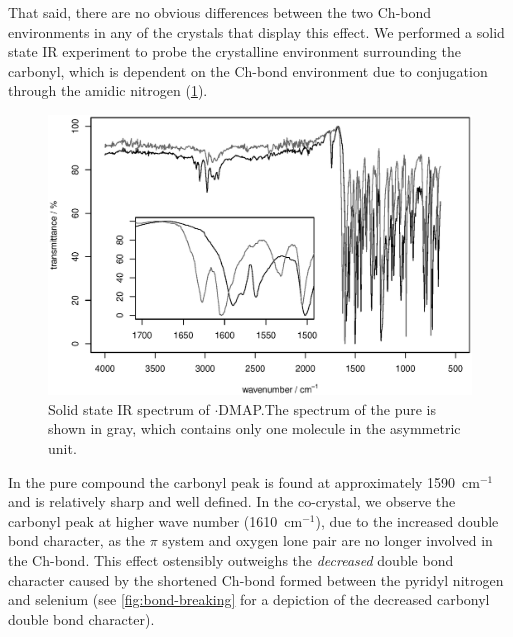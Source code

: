 \begin{refsection}
That said, there are no obvious differences between the two Ch-bond environments in any of the crystals that display this effect.
We performed a solid state IR experiment to probe the crystalline environment surrounding the carbonyl, which is dependent on the Ch-bond environment due to conjugation through the amidic nitrogen (\cref{fig:ebs-4oet-dmap-ir}).

\begin{figure}
    \centering
    \includegraphics[width=0.9\linewidth]{Figures/ebs-4oet-dmap-ir.eps}
    \caption[Solid state IR spectrum of $ \cdot $DMAP.]{Solid state IR spectrum of $ \cdot $DMAP.\@ The spectrum of the pure  is shown in gray, which contains only one molecule in the asymmetric unit.}\label{fig:ebs-4oet-dmap-ir}
\end{figure}

In the pure compound the carbonyl peak is found at approximately 1590~cm$^{-1}$ and is relatively sharp and well defined.
In the co-crystal, we observe the carbonyl peak at higher wave number (1610~cm$^{-1}$), due to the increased double bond character, as the $\pi$ system and oxygen lone pair are no longer involved in the Ch-bond.
This effect ostensibly outweighs the \emph{decreased} double bond character caused by the shortened Ch-bond formed between the pyridyl nitrogen and selenium (see \cref{fig:bond-breaking} for a depiction of the decreased carbonyl double bond character).


\end{refsection}
